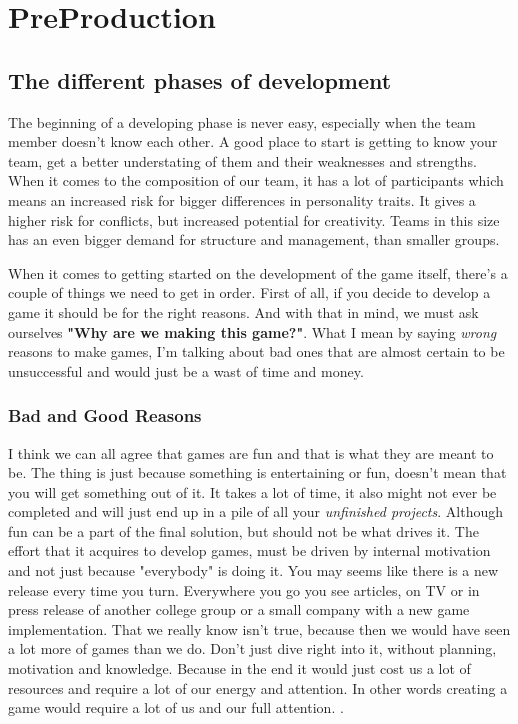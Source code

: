 \chapter{PreProduction}
\label{ch:kap7}

\section{The different phases of development}
\label{sec:DevelopmentPhases}
The beginning of a developing phase is never easy, especially when the team member doesn't know each other. A good place to start is getting to know your team, get a better understating of them and their weaknesses and strengths. When it comes to the composition of our team, it has a lot of participants which means an increased risk for bigger differences in personality traits. It gives a higher risk for conflicts, but increased potential for creativity. Teams in this size has an even bigger demand for structure and management, than smaller groups.\cite[P.~39]{ProjectManagement}

When it comes to getting started on the development of the game itself, there's a couple of things we need to get in order. 
First of all, if you decide to develop a game it should be for the right reasons. And with that in mind, we must ask ourselves \textbf{"Why are we making this game?"}.
What I mean by saying \textit{wrong} reasons to make games, I'm talking about bad ones that are almost certain to be unsuccessful and would just be a wast of time and money.\cite[P.~14]{GamificationFieldbook}

\subsection{Bad and Good Reasons}
\label{sec:GoodBad}
I think we can all agree that games are fun and that is what they are meant to be. The thing is just because something is entertaining or fun, doesn't mean that you will get something out of it. It takes a lot of time, it also might not ever be completed and will just end up in a pile of all your \textit{unfinished projects}. Although fun can be a part of the final solution, but should not be what drives it. The effort that it acquires to develop games, must be driven by internal motivation and not just because "everybody" is doing it. You may seems like there is a new release every time you turn. Everywhere you go you see articles, on TV or in press release of another college group or a small company with a new game implementation. That we really know isn't true, because then we would have seen a lot more of games than we do. Don't just dive right into it, without planning, motivation and knowledge. Because in the end it would just cost us a lot of resources and require a lot of our energy and attention. In other words creating a game would require a lot of us and our full attention. \cite[P~14-17]{GamificationFieldbook}.

